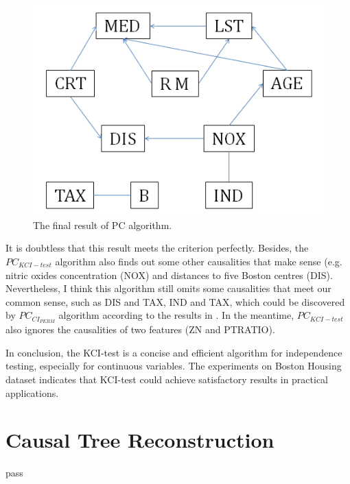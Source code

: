 \documentclass[12pt,a4paper]{article}
\theoremstyle{definition}
\begin{document}
\begin{figure}[H]
	\centering
	\includegraphics[width=0.7\linewidth]{img/res.png}
	\caption{The final result of PC algorithm.}
	\label{fig:pc-res}
\end{figure}

It is doubtless that this result meets the criterion perfectly. Besides, the $PC_{KCI-test}$ algorithm also finds out some other causalities that make sense (e.g. nitric oxides concentration (NOX) and distances to five Boston centres (DIS). Nevertheless, I think this algorithm still omits some causalities that meet our common sense, such as DIS and TAX, IND and TAX, which could be discovered by $PC_{CI_{PERM}}$ algorithm according to the results in \cite{alg}. In the meantime, $PC_{KCI-test}$ also ignores the causalities of two features (ZN and PTRATIO).

\vspace{0.008\linewidth}
In conclusion, the KCI-test is a concise and efficient algorithm for independence testing, especially for continuous variables. The experiments on Boston Housing dataset indicates that KCI-test could achieve satisfactory results in practical applications.

\section{Causal Tree Reconstruction}

pass
\end{document}
